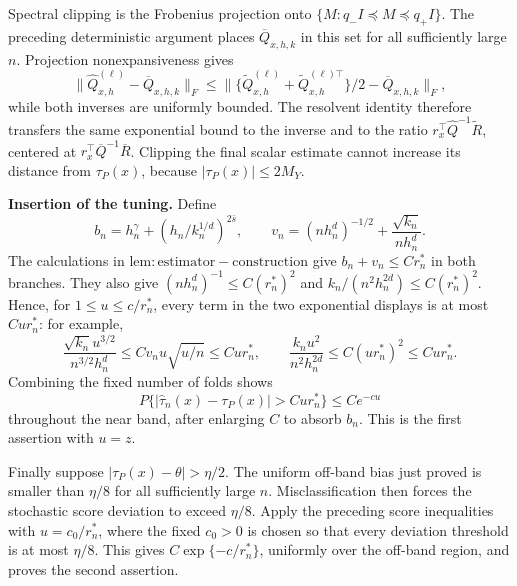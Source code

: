 Spectral clipping is the Frobenius projection onto \(\{M:q_-I\preceq M\preceq q_+I\}\). The preceding deterministic argument places \(\overline Q_{x,h,k}\) in this set for all sufficiently large \(n\). Projection nonexpansiveness gives
\[
\|\widehat Q_{x,h}^{(\ell)}-\overline Q_{x,h,k}\|_F
 \le\|\{\widetilde Q_{x,h}^{(\ell)}+\widetilde Q_{x,h}^{(\ell)\top}\}/2-\overline Q_{x,h,k}\|_F,
\]
while both inverses are uniformly bounded. The resolvent identity therefore transfers the same exponential bound to the inverse and to the ratio \(r_x^\top\widehat Q^{-1}\widetilde R\), centered at \(r_x^\top\overline Q^{-1}\overline R\). Clipping the final scalar estimate cannot increase its distance from \(\tau_P(x)\), because \(|\tau_P(x)|\le2M_Y\).

\textbf{Insertion of the tuning.} Define
\[
b_n=h_n^\gamma+(h_n/k_n^{1/d})^{2\bar s},
\qquad
v_n=(nh_n^d)^{-1/2}+\frac{\sqrt{k_n}}{nh_n^d}.
\]
The calculations in \(\mathrm{lem:estimator-construction}\) give \(b_n+v_n\le Cr_n^*\) in both branches. They also give \((nh_n^d)^{-1}\le C(r_n^*)^2\) and \(k_n/(n^2h_n^{2d})\le C(r_n^*)^2\). Hence, for \(1\le u\le c/r_n^*\), every term in the two exponential displays is at most \(Cur_n^*\): for example,
\[
\frac{\sqrt{k_n}u^{3/2}}{n^{3/2}h_n^d}
 \le Cv_nu\sqrt{u/n}\le Cur_n^*,
\qquad
\frac{k_nu^2}{n^2h_n^{2d}}
 \le C(u r_n^*)^2\le Cur_n^*.
\]
Combining the fixed number of folds shows
\[
P\{|\widehat\tau_n(x)-\tau_P(x)|>Cur_n^*\}\le Ce^{-cu}
\]
throughout the near band, after enlarging \(C\) to absorb \(b_n\). This is the first assertion with \(u=z\).

Finally suppose \(|\tau_P(x)-\theta|>\eta/2\). The uniform off-band bias just proved is smaller than \(\eta/8\) for all sufficiently large \(n\). Misclassification then forces the stochastic score deviation to exceed \(\eta/8\). Apply the preceding score inequalities with \(u=c_0/r_n^*\), where the fixed \(c_0>0\) is chosen so that every deviation threshold is at most \(\eta/8\). This gives \(C\exp\{-c/r_n^*\}\), uniformly over the off-band region, and proves the second assertion.